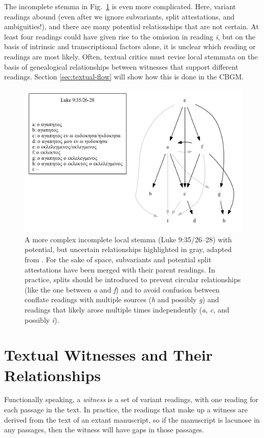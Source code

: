 \documentclass[a4paper, 12pt]{article}
\begin{document}
	\newpage
	
	The incomplete stemma in Fig.~\ref{fig:local-stemma-complex} is even more complicated. Here, variant readings abound (even after we ignore subvariants, split attestations, and ambiguities!), and there are many potential relationships that are not certain. At least four readings could have given rise to the omission in reading \emph{i}, but on the basis of intrinsic and transcriptional factors alone, it is unclear which reading or readings are most likely. Often, textual critics must revise local stemmata on the basis of genealogical relationships between witnesses that support different readings. Section \ref{sec:textual-flow} will show how this is done in the CBGM.
	
	\begin{figure}[h!]
		\centering
		\includegraphics[scale=0.6666]{../graphics/B03K9V35U26-28-local-stemma.pdf}
		\caption{A more complex incomplete local stemma (Luke 9:35/26–28) with potential, but uncertain relationships highlighted in gray, adapted from \cite{McCollum20}. For the sake of space, subvariants and potential split attestations have been merged with their parent readings. In practice, splits should be introduced to prevent circular relationships (like the one between \emph{a} and \emph{f}) and to avoid confusion between conflate readings with multiple sources (\emph{h} and possibly \emph{g}) and readings that likely arose multiple times independently (\emph{a}, \emph{c}, and possibly \emph{i}).}
		\label{fig:local-stemma-complex}
	\end{figure}
	
	\newpage
	
	\section{Textual Witnesses and Their Relationships}\label{sec:witnesses}
	Functionally speaking, a \emph{witness} is a set of variant readings, with one reading for each passage in the text. In practice, the readings that make up a witness are derived from the text of an extant manuscript, so if the manuscript is lacunose in any passages, then the witness will have gaps in those passages.
\end{document}

